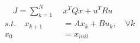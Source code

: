 \documentclass[preview]{standalone}
\begin{document}
\begin{align*}
\quad J = \sum_{k=1}^N \; &x^TQx + u^T R u \\ s.t. \quad x_{k+1} &= Ax_k + Bu_k, \quad \forall k \\ x_0 &= x_{init}
\end{align*}
\end{document}
